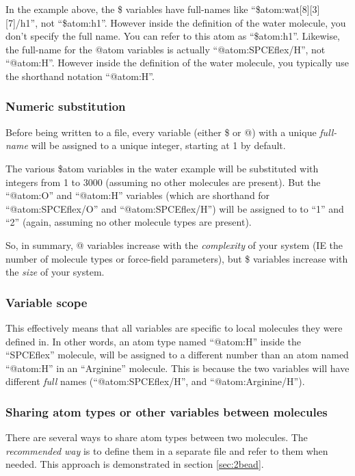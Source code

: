 \documentclass[11pt]{article}
\begin{document}
In the example above, the \$ variables have full-names like
``\$atom:wat[8][3][7]/h1'', not ``\$atom:h1''.  However inside the
definition of the water molecule, you don't specify the full name.
You can refer to this atom as ``\$atom:h1''.
Likewise, the full-name for the @atom variables is actually
``@atom:SPCEflex/H'', not ``@atom:H''. 
However inside the definition of the water molecule,
you typically use the shorthand notation ``@atom:H''.

\subsubsection{Numeric substitution}
Before being written to a file, every variable (either \$ or @) 
with a unique \textit{full-name} will be assigned to a unique integer, 
starting at 1 by default.

The various \$atom variables in the water example will be substituted 
with integers from 1 to 3000 (assuming no other molecules are present).
But the ``@atom:O'' and ``@atom:H'' variables
(which are shorthand for ``@atom:SPCEflex/O'' and ``@atom:SPCEflex/H'')
will be assigned to to ``1'' and ``2''
(again, assuming no other molecule types are present).

So, in summary, @ variables increase with the \textit{complexity} 
of your system
(IE the number of molecule types or force-field parameters), 
but \$ variables increase with the \textit{size} of your system.

\subsubsection{Variable scope}
\label{sec:variable_scope}
This effectively means that all variables are specific to
local molecules they were defined in.
In other words, an atom type named ``@atom:H'' inside 
the ``SPCEflex'' molecule, will be assigned to a different number
than an atom named ``@atom:H'' in an ``Arginine'' molecule.
This is because the two variables will have different \textit{full} names
(``@atom:SPCEflex/H'', and ``@atom:Arginine/H'').


\subsubsection*{Sharing atom types or other variables between molecules}
There are several ways to share atom types between two molecules.
The \textit{recommended way} is to define them in a separate
file and refer to them when needed.
This approach is demonstrated in section \ref{sec:2bead}.
\end{document}
